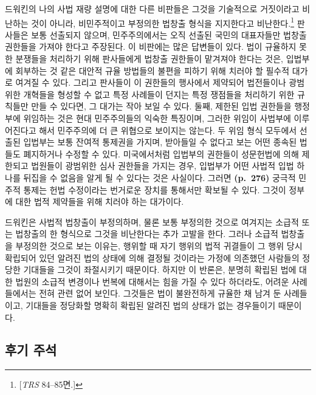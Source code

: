 드워킨의 나의 사법 재량 설명에 대한 다른 비판들은 그것을 기술적으로
거짓이라고 비난하는 것이 아니라, 비민주적이고 부정의한 법창출 형식을
지지한다고 비난한다.\footnote{{[}\emph{TRS} 84--85면.{]}} 판사들은 보통
선출되지 않으며, 민주주의에서는 오직 선출된 국민의 대표자들만 법창출
권한들을 가져야 한다고 주장된다. 이 비판에는 많은 답변들이 있다. 법이
규율하지 못한 분쟁들을 처리하기 위해 판사들에게 법창출 권한들이 맡겨져야
한다는 것은, 입법부에 회부하는 것 같은 대안적 규율 방법들의 불편을
피하기 위해 치러야 할 필수적 대가로 여겨질 수 있다. 그리고 판사들이 이
권한들의 행사에서 제약되어 법전들이나 광범위한 개혁들을 형성할 수 없고
특정 사례들이 던지는 특정 쟁점들을 처리하기 위한 규칙들만 만들 수
있다면, 그 대가는 작아 보일 수 있다. 둘째, 제한된 입법 권한들을 행정부에
위임하는 것은 현대 민주주의들의 익숙한 특징이며, 그러한 위임이 사법부에
이루어진다고 해서 민주주의에 더 큰 위협으로 보이지는 않는다. 두 위임
형식 모두에서 선출된 입법부는 보통 잔여적 통제권을 가지며, 받아들일 수
없다고 보는 어떤 종속된 법들도 폐지하거나 수정할 수 있다. 미국에서처럼
입법부의 권한들이 성문헌법에 의해 제한되고 법원들이 광범위한 심사
권한들을 가지는 경우,  입법부가 어떤 사법적 입법
하나를 뒤집을 수 없음을 알게 될 수 있다는 것은 사실이다. 그러면
\textbf{(p.~276)} 궁극적 민주적 통제는 헌법 수정이라는 번거로운 장치를
통해서만 확보될 수 있다. 그것이 정부에 대한 법적 제약들을 위해 치러야
하는 대가이다.

드워킨은 사법적 법창출이 부정의하며, 물론 보통 부정의한 것으로 여겨지는
소급적 또는  법창출의 한 형식으로 그것을 비난한다는 추가
고발을 한다. 그러나 소급적 법창출을 부정의한 것으로 보는 이유는, 행위할
때 자기 행위의 법적 귀결들이 그 행위 당시 확립되어 있던 알려진 법의
상태에 의해 결정될 것이라는 가정에 의존했던 사람들의 정당한 기대들을
그것이 좌절시키기 때문이다. 하지만 이 반론은, 분명히 확립된 법에 대한
법원의 소급적 변경이나 번복에 대해서는 힘을 가질 수 있다 하더라도,
어려운 사례들에서는 전혀 관련 없어 보인다. 그것들은 법이 불완전하게
규율한 채 남겨 둔 사례들이고, 기대들을 정당화할 명확히 확립된 알려진
법의 상태가 없는 경우들이기 때문이다.

\newpage

\subsection{후기 주석}\label{uxd6c4uxae30-uxc8fcuxc11d}


